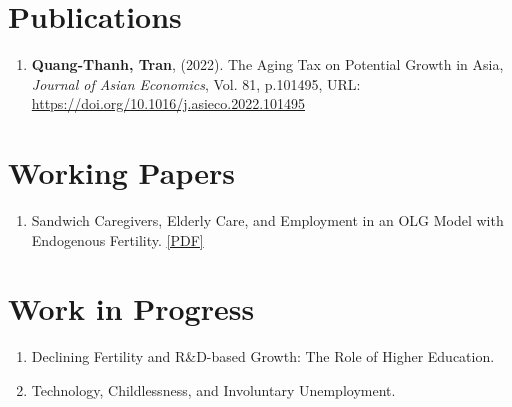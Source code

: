 \section{\sc Publications}
\begin{enumerate}
\item
  {\bf Quang-Thanh, Tran},
  (2022).
  {The Aging Tax on Potential Growth in Asia},
  {\it Journal of Asian Economics}, Vol. 81, p.101495,
  {URL: \url{https://doi.org/10.1016/j.asieco.2022.101495}}
\end{enumerate}

\section{\sc Working Papers}
\begin{enumerate}
  \item Sandwich Caregivers, Elderly Care, and Employment in an OLG Model with Endogenous Fertility. \href{https://thanhqtran.github.io/wp/QTTran_Elderly.pdf}{[PDF]}
\end{enumerate}

\section{\sc Work in Progress}
\begin{enumerate}
  \item Declining Fertility and R\&D-based Growth: The Role of Higher Education.
  \item Technology, Childlessness, and Involuntary Unemployment.
\end{enumerate}


